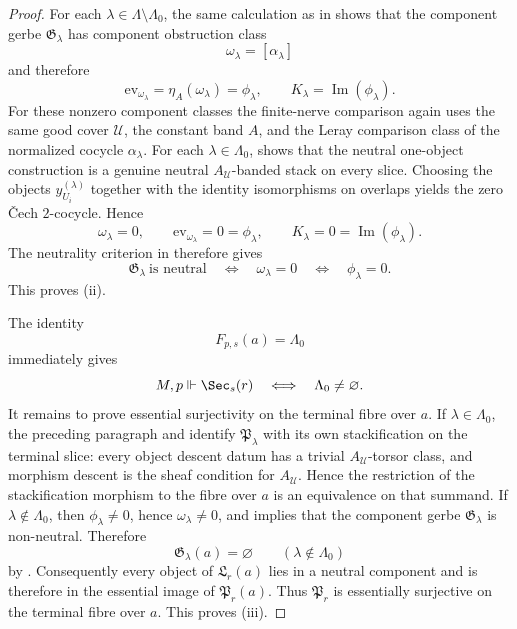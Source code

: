 \begin{proof}
For each $\lambda\in\Lambda\setminus\Lambda_0$, the same calculation as in  shows that the component gerbe $\mathfrak G_\lambda$ has component obstruction class
\[
\omega_\lambda=[\alpha_\lambda]
\]
and therefore
\[
\mathrm{ev}_{\omega_\lambda}=\eta_A(\omega_\lambda)=\phi_\lambda,
\qquad
K_\lambda=\operatorname{Im}(\phi_\lambda).
\]
For these nonzero component classes the finite-nerve comparison again uses the same good cover $\mathcal U$, the constant band $A$, and the Leray comparison class of the normalized cocycle $\alpha_\lambda$.
For each $\lambda\in\Lambda_0$, 
shows that the neutral one-object construction is a genuine neutral
\(A_{\mathcal U}\)-banded stack on every slice. Choosing the objects
$y_{U_i}^{(\lambda)}$ together with the identity isomorphisms on overlaps
yields the zero \v{C}ech $2$-cocycle. Hence
\[
\omega_\lambda=0,
\qquad
\mathrm{ev}_{\omega_\lambda}=0=\phi_\lambda,
\qquad
K_\lambda=0=\operatorname{Im}(\phi_\lambda).
\]
The neutrality criterion in
 therefore gives
\[
\mathfrak G_\lambda\ \text{is neutral}
\quad\Longleftrightarrow\quad
\omega_\lambda=0
\quad\Longleftrightarrow\quad
\phi_\lambda=0.
\]
This proves \textup{(ii)}.

The identity
\[
F_{p,s}(a)=\Lambda_0
\]
immediately gives
\[
M,p\Vdash \Sec_s(r)
\quad\Longleftrightarrow\quad
\Lambda_0\neq\varnothing.
\]
It remains to prove essential surjectivity on the terminal fibre over $a$. If \(\lambda\in\Lambda_0\),
the preceding paragraph and  identify
\(\mathfrak P_\lambda\) with its own stackification on the terminal slice:
every object descent datum has a trivial \(A_{\mathcal U}\)-torsor class, and
morphism descent is the sheaf condition for \(A_{\mathcal U}\). Hence the
restriction of the stackification morphism to the fibre over \(a\) is an
equivalence on that summand. If $\lambda\notin\Lambda_0$, then
$\phi_\lambda\neq 0$, hence $\omega_\lambda\neq 0$, and
 implies that the component gerbe
$\mathfrak G_\lambda$ is non-neutral. Therefore
\[
\mathfrak G_\lambda(a)=\varnothing
\qquad
(\lambda\notin\Lambda_0)
\]
by . Consequently every object of $\mathfrak L_r(a)$ lies in a neutral component and is therefore in the essential image of $\mathfrak P_r(a)$. Thus $\mathfrak P_r$ is essentially surjective on the terminal fibre over $a$. This proves \textup{(iii)}.


\end{proof}
